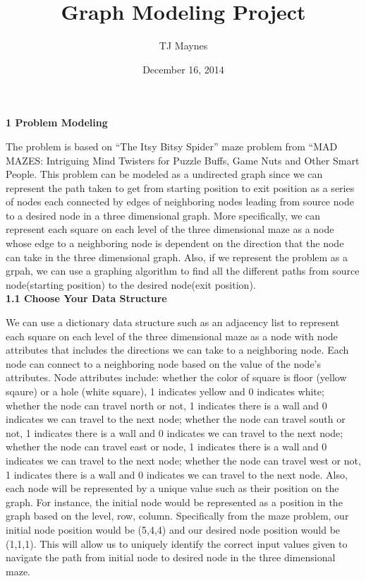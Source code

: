 \documentclass[12pt]{article}
\begin{document}
\title{Graph Modeling Project}
\author{TJ Maynes}
\date{December 16, 2014}

\maketitle

\textbf{1 Problem Modeling}

 The problem is based on ``The Itsy Bitsy Spider'' maze problem from ``MAD MAZES: Intriguing Mind Twisters for Puzzle Buffs, Game Nuts and Other Smart People. This problem can be modeled as a undirected graph since we can represent the path taken to get from starting position to exit position as a series of nodes each connected by edges of neighboring nodes leading from source node to a desired node in a three dimensional graph. More specifically, we can represent each square on each level of the three dimensional maze as a node whose edge to a neighboring node is dependent on the direction that the node can take in the three dimensional graph. Also, if we represent the problem as a grpah, we can use a graphing algorithm to find all the different paths from source node(starting position) to the desired node(exit position). \\

\vspace{0.1in}
\textbf{1.1 Choose Your Data Structure}

We can use a dictionary data structure such as an adjacency list to represent each square on each level of the three dimensional maze as a node with node attributes that includes the directions we can take to a neighboring node. Each node can connect to a neighboring node based on the value of the node's attributes. Node attributes include: whether the color of square is floor (yellow sqaure) or a hole (white square), 1 indicates yellow and 0 indicates white; whether the node can travel north or not, 1 indicates there is a wall and 0 indicates we can travel to the next node; whether the node can travel south or not, 1 indicates there is a wall and 0 indicates we can travel to the next node; whether the node can travel east or node, 1 indicates there is a wall and 0 indicates we can travel to the next node; whether the node can travel west or not, 1 indicates there is a wall and 0 indicates we can travel to the next node. Also, each node will be represented by a unique value such as their position on the graph. For instance, the initial node would be represented as a position in the graph based on the level, row, column. Specifically from the maze problem, our initial node position would be (5,4,4) and our desired node position would be (1,1,1). This will allow us to uniquely identify the correct input values given to navigate the path from initial node to desired node in the three dimensional maze.\\
\end{document}
